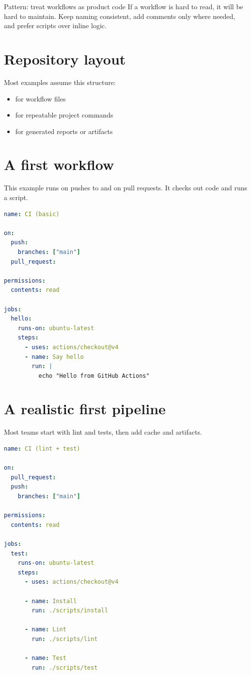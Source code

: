 \begin{patternbox}{Pattern: treat workflows as product code}
If a workflow is hard to read, it will be hard to maintain.
Keep naming consistent, add comments only where needed, and prefer scripts over inline logic.
\end{patternbox}

\section{Repository layout}
Most examples assume this structure:
\begin{itemize}[nosep]
  \item {} for workflow files
  \item {} for repeatable project commands
  \item {} for generated reports or artifacts
\end{itemize}

\section{A first workflow}
This example runs on pushes to  and on pull requests.
It checks out code and runs a script.

\begin{lstlisting}[language=YAML]
name: CI (basic)

on:
  push:
    branches: ["main"]
  pull_request:

permissions:
  contents: read

jobs:
  hello:
    runs-on: ubuntu-latest
    steps:
      - uses: actions/checkout@v4
      - name: Say hello
        run: |
          echo "Hello from GitHub Actions"
\end{lstlisting}

\section{A realistic first pipeline}
Most teams start with lint and tests, then add cache and artifacts.

\begin{lstlisting}[language=YAML]
name: CI (lint + test)

on:
  pull_request:
  push:
    branches: ["main"]

permissions:
  contents: read

jobs:
  test:
    runs-on: ubuntu-latest
    steps:
      - uses: actions/checkout@v4

      - name: Install
        run: ./scripts/install

      - name: Lint
        run: ./scripts/lint

      - name: Test
        run: ./scripts/test
\end{lstlisting}

